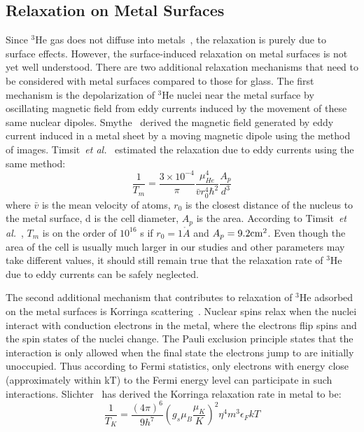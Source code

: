 \subsection{Relaxation on Metal Surfaces}

Since $^{3}$He gas does not diffuse into metals~\cite{barrer}, the relaxation is purely due to surface effects. However, the surface-induced relaxation on metal surfaces is not yet well understood. There are two additional relaxation mechanisms that need to be considered with metal surfaces compared to those for glass. The first mechanism is the depolarization of $^{3}$He nuclei near the metal surface by oscillating magnetic field from eddy currents induced by the movement of these same nuclear dipoles. Smythe~\cite{Smythe} derived the magnetic field generated by eddy current induced in a metal sheet by a moving magnetic dipole using the method of images. Timsit~\emph{et al.}~\cite{Timsit} estimated the relaxation due to eddy currents using the same method:
\begin{equation}
\frac{1}{T_m} = \frac{3\times 10^{-4}}{\pi} \frac{\mu_{He}^4}{\bar{v}r_{0}^{4}\hbar^{2}}\frac{A_p}{d^3}
\end{equation}
where $\bar{v}$ is the mean velocity of atoms, $r_0$ is the closest distance of the nucleus to the metal surface, d is the cell diameter, $A_p$ is the area. According to Timsit~\emph{et al.}~\cite{Timsit}, $T_m$ is on the order of $10^{16}$ s if $r_0=1\mathring{A}$ and $A_p = 9.2{\rm cm}^2$. Even though the area of the cell is usually much larger in our studies and other parameters may take different values, it should still remain true that the relaxation rate of $^{3}$He due to eddy currents can be safely neglected.

The second additional mechanism that contributes to relaxation of $^{3}$He adsorbed on the metal surfaces is Korringa scattering~\cite{Korringa}. Nuclear spins relax when the nuclei interact with conduction electrons in the metal, where the electrons flip spins and the spin states of the nuclei change. The Pauli exclusion principle states that the interaction is only allowed when the final state the electrons jump to are initially unoccupied. Thus according to Fermi statistics, only electrons with energy close (approximately within kT) to the Fermi energy level can participate in such interactions. Slichter~\cite{Slichter} has derived the Korringa relaxation rate in metal to be:
\begin{equation}
\frac{1}{T_K}=\frac{(4\pi)^6}{9h^7}(g_s\mu_B \frac{\mu_K}{K})^2 \eta^4m^3\epsilon_F kT
\end{equation}

